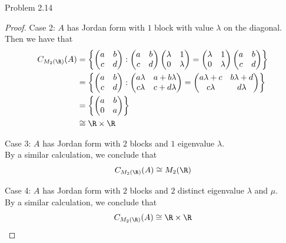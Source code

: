 \documentclass[a4paper]{article}
\begin{document}
\begin{ex}{Problem 2.14}{}
\begin{proof}
Case 2: $A$ has Jordan form with $1$ block with value $\lambda$ on the diagonal. \\
Then we have that
\begin{align*}
C_{M_2(\R)}(A)&=\left\{ \begin{pmatrix}a&b\\c&d\end{pmatrix}:\begin{pmatrix}a&b\\c&d\end{pmatrix}\begin{pmatrix}\lambda & 1 \\ 0 & \lambda\end{pmatrix}=\begin{pmatrix}\lambda & 1 \\ 0 & \lambda\end{pmatrix}\begin{pmatrix}a&b\\c&d\end{pmatrix} \right\}\\
&=\left\{ \begin{pmatrix}a&b\\c&d\end{pmatrix}: \begin{pmatrix}
    a\lambda & a+b\lambda \\ c\lambda & c+d\lambda
\end{pmatrix}=\begin{pmatrix}
    a\lambda+c & b\lambda+d \\ c\lambda & d\lambda
\end{pmatrix} \right\} \\
&=\left\{ \begin{pmatrix}a & b \\ 0 & a\end{pmatrix} \right\}\\
&\cong \R\times\R
\end{align*}

Case 3: $A$ has Jordan form with $2$ blocks and $1$ eigenvalue $\lambda$. \\
By a similar calculation, we conclude that $$C_{M_2(\R)}(A)\cong M_2(\R)$$

Case 4: $A$ has Jordan form with $2$ blocks and $2$ distinct eigenvalue $\lambda$ and $\mu$. \\
By a similar calculation, we conclude that $$C_{M_2(\R)}(A)\cong\R\times\R$$

\end{proof}
\end{ex}
\end{document}
